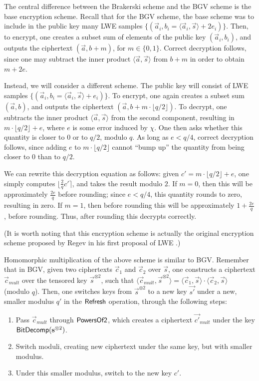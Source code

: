         The central difference between the Brakerski scheme and the BGV scheme is the base encryption scheme. Recall that for the BGV scheme, the base scheme was to include in the public key many LWE samples $\{(\vec{a}_i, b_i = \langle \vec{a}_i, \vec{s} \rangle + 2 e_i)\}.$ Then, to encrypt, one creates a subset sum of elements of the public key $(\vec{a}_i, b_i)$, and outputs the ciphertext $(\vec{a}, b + m)$, for $m \in \{0, 1\}$. Correct decryption follows, since one may subtract the inner product $\langle \vec{a}, \vec{s} \rangle$ from $b + m$
        in order to obtain $m + 2e$.

        Instead, we will consider a different scheme. The public key will consist of LWE samples $\{(\vec{a}_i, b_i = \langle \vec{a}_i, \vec{s} \rangle + e_i)\}$. To encrypt, one again creates a subset sum $(\vec{a}, b)$, and outputs the ciphertext $(\vec{a}, b + m \cdot \lfloor q / 2 \rfloor)$. To decrypt, one subtracts the inner product $\langle \vec{a}, \vec{s} \rangle$ from the second component, resulting in $m \cdot \lfloor q / 2 \rfloor + e$, where $e$ is some error induced by $\chi$.
        One then asks whether this quantity is closer to $0$ or to $q/2$, modulo $q$.
        As long as $e < q/4$, correct decryption follows, since adding $e$ to $m \cdot \lfloor q/2 \rfloor$ cannot ``bump up'' the quantity from being closer to $0$ than to $q/2$.

        We can rewrite this decryption equation as follows: given $c' = m \cdot \lfloor q / 2 \rfloor + e$, one simply computes $\lfloor \frac{2}{q} c' \rceil$, and takes the result modulo $2$. If $m = 0$, then this will be approximately $\frac{2e}{q}$ before rounding; since $e < q/4$, this quantity rounds to zero, resulting in zero. If $m = 1$, then before rounding this will be approximately $1 + \frac{2e}{q}$, before rounding. Thus, after rounding this decrypts correctly.

        (It is worth noting that this encryption scheme is actually the original encryption scheme proposed by Regev in his first proposal of LWE \cite{regev2005}.)

        Homomorphic multiplication of the above scheme is similar to BGV. Remember that in BGV, given two ciphertexts $\vec{c}_1$ and $\vec{c}_2$ over $\vec{s}$, one constructs a ciphertext $\vec{c}_{mult}$ over the tensored key $\vec{s}^{\otimes 2}$, such that $\langle \vec{c}_{mult}, \vec{s}^{\otimes 2} \rangle = \langle \vec{c}_1, \vec{s} \rangle \cdot \langle \vec{c}_2, \vec{s} \rangle$ (modulo $q$).
        Then, one switches keys from $\vec{s}^{\otimes 2}$ to a new key $\vec{s'}$ under a new, smaller modulus $q'$ in the ${\sf Refresh}$ operation, through the following steps:
        \begin{enumerate}
            \item Pass $\vec{c}_{mult}$ through ${\sf PowersOf2}$, which creates a ciphertext $\vec{c'}_{mult}$ under the key ${\sf BitDecomp}(\vec{s}^{\otimes 2})$.
            \item Switch moduli, creating new ciphertext under the same key, but with smaller modulus.
            \item Under this smaller modulus, switch to the new key $c'$.
        \end{enumerate}

